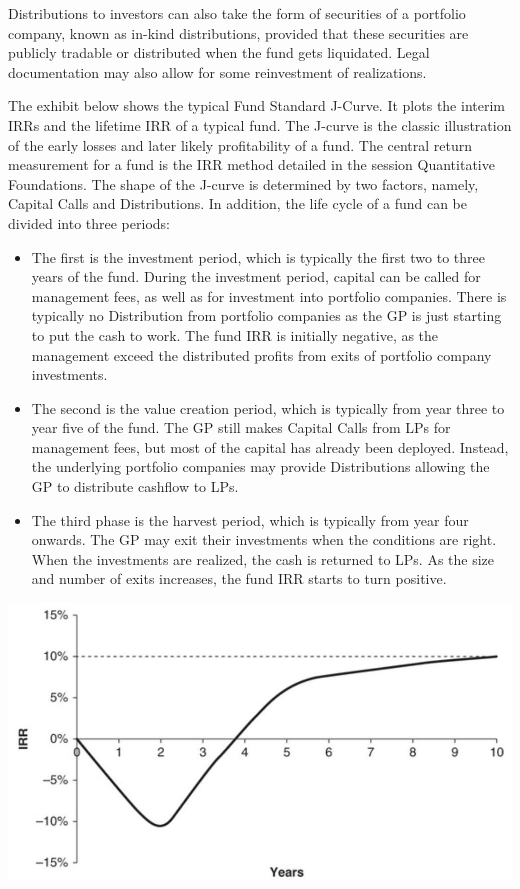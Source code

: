 \documentclass[11pt]{article}
\begin{document}
Distributions to investors can also take the form of securities of a portfolio company, known as in-kind distributions, provided that these securities are publicly tradable or distributed when the fund gets liquidated. Legal documentation may also allow for some reinvestment of realizations.

The exhibit below shows the typical Fund Standard J-Curve. It plots the interim IRRs and the lifetime IRR of a typical fund. The J-curve is the classic illustration of the early losses and later likely profitability of a fund. The central return measurement for a fund is the IRR method detailed in the session Quantitative Foundations. The shape of the J-curve is determined by two factors, namely, Capital Calls and Distributions. In addition, the life cycle of a fund can be divided into three periods:

\begin{itemize}
  \item The first is the investment period, which is typically the first two to three years of the fund. During the investment period, capital can be called for management fees, as well as for investment into portfolio companies. There is typically no Distribution from portfolio companies as the GP is just starting to put the cash to work. The fund IRR is initially negative, as the management exceed the distributed profits from exits of portfolio company investments.
  \item The second is the value creation period, which is typically from year three to year five of the fund. The GP still makes Capital Calls from LPs for management fees, but most of the capital has already been deployed. Instead, the underlying portfolio companies may provide Distributions allowing the GP to distribute cashflow to LPs.
  \item The third phase is the harvest period, which is typically from year four onwards. The GP may exit their investments when the conditions are right. When the investments are realized, the cash is returned to LPs. As the size and number of exits increases, the fund IRR starts to turn positive.
\end{itemize}

\begin{center}
\includegraphics[max width=\textwidth]{2024_04_10_9afab3e78f4ed9e425bag-4}
\end{center}
\end{document}
